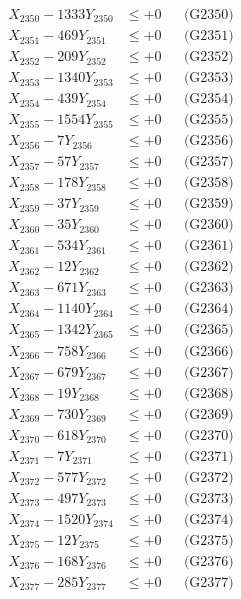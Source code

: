 \documentclass[a4paper,10pt]{article}
\begin{document}
{\begin{align}
X_{2350} - 1333Y_{2350} &\leq +0 && \text{(G2350)} \\
\allowbreak
X_{2351} - 469Y_{2351} &\leq +0 && \text{(G2351)} \\
X_{2352} - 209Y_{2352} &\leq +0 && \text{(G2352)} \\
X_{2353} - 1340Y_{2353} &\leq +0 && \text{(G2353)} \\
X_{2354} - 439Y_{2354} &\leq +0 && \text{(G2354)} \\
X_{2355} - 1554Y_{2355} &\leq +0 && \text{(G2355)} \\
X_{2356} - 7Y_{2356} &\leq +0 && \text{(G2356)} \\
X_{2357} - 57Y_{2357} &\leq +0 && \text{(G2357)} \\
X_{2358} - 178Y_{2358} &\leq +0 && \text{(G2358)} \\
X_{2359} - 37Y_{2359} &\leq +0 && \text{(G2359)} \\
X_{2360} - 35Y_{2360} &\leq +0 && \text{(G2360)} \\
\allowbreak
X_{2361} - 534Y_{2361} &\leq +0 && \text{(G2361)} \\
X_{2362} - 12Y_{2362} &\leq +0 && \text{(G2362)} \\
X_{2363} - 671Y_{2363} &\leq +0 && \text{(G2363)} \\
X_{2364} - 1140Y_{2364} &\leq +0 && \text{(G2364)} \\
X_{2365} - 1342Y_{2365} &\leq +0 && \text{(G2365)} \\
X_{2366} - 758Y_{2366} &\leq +0 && \text{(G2366)} \\
X_{2367} - 679Y_{2367} &\leq +0 && \text{(G2367)} \\
X_{2368} - 19Y_{2368} &\leq +0 && \text{(G2368)} \\
X_{2369} - 730Y_{2369} &\leq +0 && \text{(G2369)} \\
X_{2370} - 618Y_{2370} &\leq +0 && \text{(G2370)} \\
\allowbreak
X_{2371} - 7Y_{2371} &\leq +0 && \text{(G2371)} \\
X_{2372} - 577Y_{2372} &\leq +0 && \text{(G2372)} \\
X_{2373} - 497Y_{2373} &\leq +0 && \text{(G2373)} \\
X_{2374} - 1520Y_{2374} &\leq +0 && \text{(G2374)} \\
X_{2375} - 12Y_{2375} &\leq +0 && \text{(G2375)} \\
X_{2376} - 168Y_{2376} &\leq +0 && \text{(G2376)} \\
X_{2377} - 285Y_{2377} &\leq +0 && \text{(G2377)} \\

\end{align}}
\end{document}
